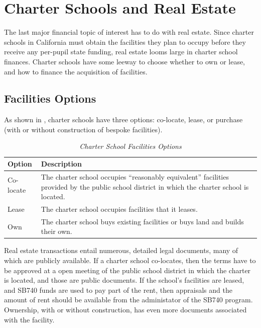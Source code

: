 \section{Charter Schools and Real Estate}\label{sec:real-estate}\indent%

The last major financial topic of interest has to do with real estate. Since charter schools in California must obtain the facilities they plan to occupy before they receive any per-pupil state funding, real estate looms large in charter school finances. Charter schools have some leeway to choose whether to own or lease, and how to finance the acquisition of facilities.

\subsection{Facilities Options}\label{sec:facilities-options}\indent%

As shown in , charter schools have three options: co-locate, lease, or purchase (with or without construction of bespoke facilities).

\begin{table}[ht]
  \small%
  \caption[Charter School Facilities Options]{\textit{Charter School Facilities Options}}\label{tab:charter-facilities-options}%
  \begin{tabular}{ll}
    \toprule%
    Option    & Description \\
    \midrule%
    Co-locate & \multirow[t]{2}{4.75in}{The charter school occupies ``reasonably equivalent'' facilities provided by 
                the public school district in which the charter school is located.}\\
                \\
    Lease     & The charter school occupies facilities that it leases.\\
    Own       & The charter school buys existing facilities or buys land and builds their own. \\
    \bottomrule%
  \end{tabular}
\end{table}

Real estate transactions entail numerous, detailed legal documents, many of which are publicly available. If a charter school co-locates, then the terms have to be approved at a open meeting of the public school district in which the charter is located, and those are public documents. If the school's facilities are leased, and SB740 funds are used to pay part of the rent, then appraisals and the amount of rent should be available from the administator of the SB740 program. Ownership, with or without construction, has even more documents associated with the facility.

